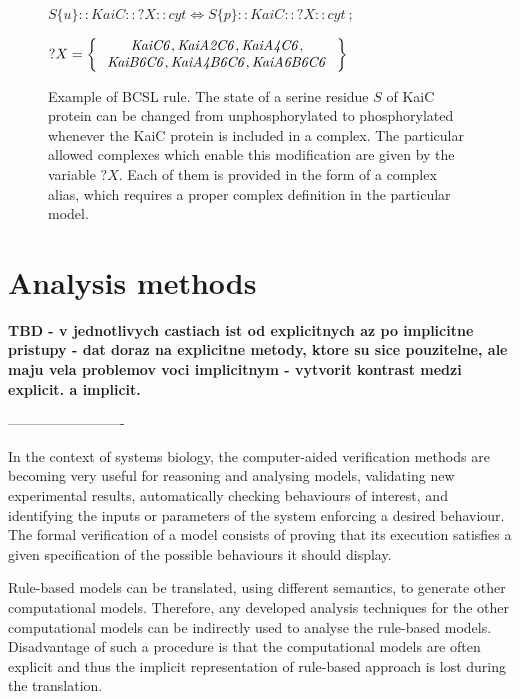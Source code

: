 \documentclass[11pt,a4paper]{report}
\begin{document}
\begin{figure}
	\begin{center}
		$ S\{u\}{::}KaiC{::}?X{::}cyt \Leftrightarrow S\{p\}{::}KaiC{::}?X{::}cyt ~;~$
		
		$ ?X = \Set{
			\begin{array}{c}
			\mathit{KaiC6}, \mathit{KaiA2C6}, \mathit{KaiA4C6},\\
			\mathit{KaiB6C6}, \mathit{KaiA4B6C6}, \mathit{KaiA6B6C6}
			\end{array}
		}$
	\end{center}
	\caption{Example of BCSL rule. The state of a serine residue $S$ of KaiC protein can be changed from unphosphorylated to phosphorylated whenever the KaiC protein is included in a complex. The particular allowed complexes which enable this modification are given by the variable $?X$. Each of them is provided in the form of a complex alias, which requires a proper complex definition in the particular model.}
	\label{BCSL_rule}
\end{figure}

\section{Analysis methods}

\textbf{TBD - v jednotlivych castiach ist od explicitnych az po implicitne pristupy
- dat doraz na explicitne metody, ktore su sice pouzitelne, ale maju vela problemov voci implicitnym
- vytvorit kontrast medzi explicit. a implicit.}

-------------------------

In the context of systems biology, the computer-aided verification methods are becoming very useful for reasoning and analysing models, validating new experimental results, automatically checking behaviours of interest, and identifying the inputs or parameters of the system enforcing a desired behaviour. The formal verification of a model consists of proving that its execution satisfies a given specification of the possible behaviours it should display.

Rule-based models can be translated, using different semantics, to generate other computational models. Therefore, any developed analysis techniques for the other computational models can be indirectly used to analyse the rule-based models. Disadvantage of such a procedure is that the computational models are often explicit and thus the implicit representation of rule-based approach is lost during the translation.
\end{document}
